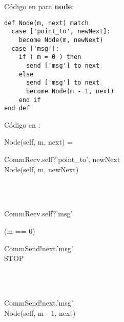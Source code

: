 Código en \SAL para \textbf{node}:

\begin{lstlisting}[language=sal, style=simple]
def Node(m, next) match
  case ['point_to', newNext]:
    become Node(m, newNext)
  case ['msg']:
    if ( m = 0 ) then
      send ['msg'] to next
    else
      send ['msg'] to next
      become Node(m - 1, next)
    end if
end def
\end{lstlisting}

Código en \CSP:

\begin{process}
Node(self, m, next) = \\ \quad
  \begin{block}
  CommRecv.self?\langle 'point\_to', newNext \rangle \then \\
  Node(self, m, newNext)
  \end{block} \\

  \Extchoice \\ \quad
  
  \begin{block}
  CommRecv.self?\langle 'msg' \rangle \then {} \\ \quad
    \begin{block}
    \If (m == 0) \Then {} \\ \quad
      \begin{block} 
      CommSend!next.\langle 'msg' \rangle \then \\
      STOP
      \end{block} \\
    \Else {} \\ \quad
      \begin{block}
      CommSend!next.\langle 'msg' \rangle \then \\
      Node(self, m - 1, next) 
      \end{block}
    \end{block}
  \end{block} 
\end{process}

% 

